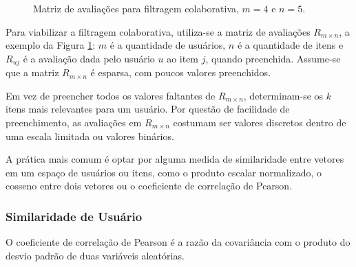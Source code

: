 \begin{figure}[h!]
    \centering
    \caption{Matriz de avaliações para filtragem colaborativa, $m=4$ e $n=5$.}
    \label{fig:ratings_matrix}
\end{figure}

Para viabilizar a filtragem colaborativa, utiliza-se a matriz de avaliações
$R_{m \times n}$, a exemplo da Figura \ref{fig:ratings_matrix}: $m$ é a quantidade de usuários, $n$ é a quantidade de
itens e $R_{uj}$ é a avaliação dada pelo usuário $u$ ao item $j$, quando
preenchida. Assume-se que a matriz $R_{m \times n}$ é esparsa, com poucos
valores preenchidos.

Em vez de preencher todos os valores faltantes de $R_{m \times n}$,
determinam-se os $k$ itens mais relevantes para um usuário. Por questão de
facilidade de preenchimento, as avaliações em $R_{m \times n}$ costumam ser
valores discretos dentro de uma escala limitada ou valores binários.

A prática mais comum é optar por alguma medida de similaridade entre vetores em
um espaço de usuários ou itens, como o produto escalar normalizado, o cosseno
entre dois vetores ou o coeficiente de correlação de Pearson.

\subsubsection{Similaridade de Usuário}
O coeficiente de correlação de Pearson é a razão da covariância com o produto
do desvio padrão de duas variáveis aleatórias.

